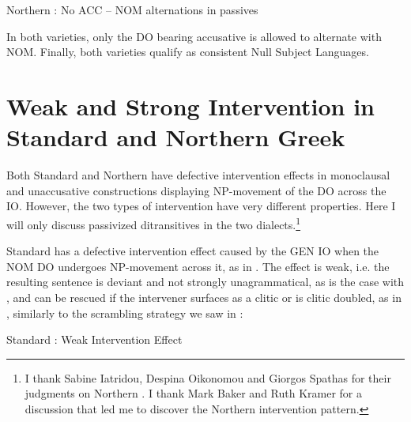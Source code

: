 \documentclass[output=paper]{LSP/langsci}
\begin{document}
\ea\label{ex:anagnost:15}
Northern : No ACC  – NOM alternations in passives\\


\z
\z

In both varieties, only the DO bearing accusative is allowed to alternate with NOM. Finally, both varieties qualify as consistent Null Subject Languages.

\section{Weak and Strong Intervention in Standard and Northern Greek}\label{sec:anagnost:4}
Both Standard and Northern  have defective intervention effects in monoclausal  and unaccusative constructions displaying NP-movement of the DO across the IO. However, the two types of intervention have very different properties. Here I will only discuss passivized ditransitives in the two dialects.\footnote{\label{fn:anagnost:3}I thank Sabine Iatridou, Despina Oikonomou and Giorgos Spathas for their judgments on Northern . I thank Mark Baker and Ruth Kramer for a discussion that led me to discover the Northern  intervention pattern.}

Standard  has a defective intervention effect caused by the GEN IO when the NOM DO undergoes NP-movement across it, as in  \citep{Anagnostopoulou2003}. The effect is weak, i.e. the resulting sentence is deviant and not strongly unagrammatical, as is the case with  , and can be rescued if the intervener surfaces as a clitic or is clitic doubled, as in , similarly to the  scrambling strategy we saw in :   

\ea\label{ex:anagnost:16}
Standard : Weak Intervention Effect  
\z \z
\end{document}
